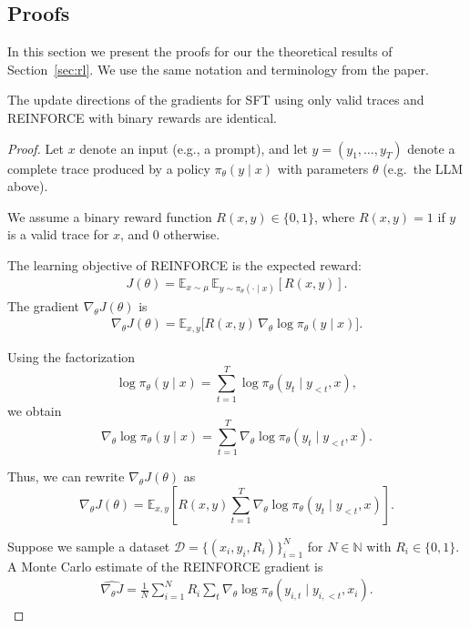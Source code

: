 \subsection{Proofs}
\label{appendix:proofs}

In this section we present the proofs for our the theoretical results of
Section~\ref{sec:rl}. We use the same notation and terminology from the paper.

\setcounter{proposition}{0}

\begin{proposition}
The update directions of the gradients for SFT using only
valid traces and REINFORCE with binary rewards are identical.
\end{proposition}

\begin{proof}
Let $x$ denote an input (e.g., a prompt), and let $y = (y_1,\dots,y_T)$ denote a
complete trace produced by a policy $\pi_\theta(y \mid x)$ with parameters
$\theta$ (e.g.\ the LLM above).

We assume a binary reward function $R(x,y) \in \{0,1\}$, where $R(x,y) = 1$ if
$y$ is a valid trace for $x$, and 0 otherwise.

The learning objective of REINFORCE is the expected reward:
\begin{align*}
J(\theta) = \mathbb{E}_{x \sim \mu} \, \mathbb{E}_{y \sim \pi_\theta(\cdot\mid x)}[R(x,y)].
\end{align*}
The gradient $\nabla_\theta J(\theta)$ is
\begin{align*}
\nabla_\theta J(\theta)
= \mathbb{E}_{x,y}
\big[ R(x,y)\,\nabla_\theta \log \pi_\theta(y\mid x) \big].
\end{align*}

Using the factorization
\[
\log \pi_\theta(y\mid x)
= \sum_{t=1}^T \log \pi_\theta(y_t \mid y_{<t}, x),
\]
we obtain
\[
\nabla_\theta \log \pi_\theta(y\mid x)
= \sum_{t=1}^T
\nabla_\theta \log \pi_\theta(y_t \mid y_{<t}, x).
\]

Thus, we can rewrite $\nabla_\theta J(\theta)$ as
\[
\nabla_\theta J(\theta)
=
\mathbb{E}_{x,y}
\left[
R(x,y) \sum_{t=1}^T
\nabla_\theta
\log \pi_\theta(y_t \mid y_{<t}, x)
\right].
\]

Suppose we sample a dataset $\mathcal{D} = \{(x_i, y_i, R_i)\}_{i=1}^N$ for $N \in \mathbb{N}$ with $R_i \in \{0,1\}$.
A Monte Carlo estimate of the REINFORCE gradient is
\begin{align*}
\widehat{\nabla_\theta J} = \frac{1}{N} \sum_{i=1}^N R_i \sum_{t} \nabla_\theta \log \pi_\theta(y_{i,t} \mid y_{i,<t}, x_i).
\end{align*}


\end{proof}
